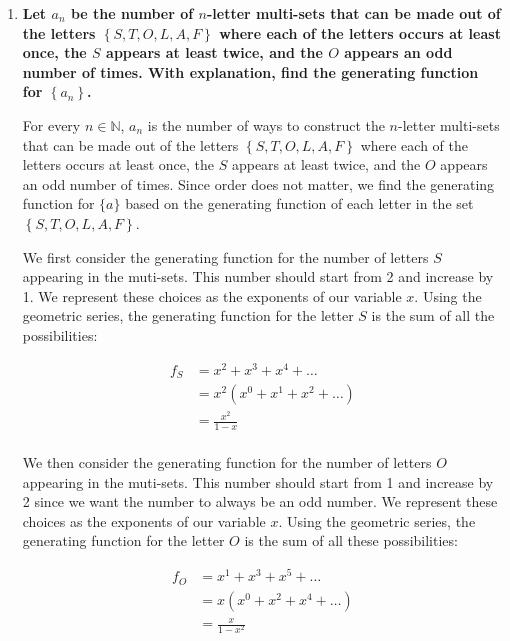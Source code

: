 \documentclass[10pt]{article}
\begin{document}
\begin{enumerate}
\begin{enumerate}
Using the formula $2^n = \sum\limits_{i=0}^n\binom{n}{i}$, we have:

\begin{align*}
\sum\limits_{k=1}^{2012}\binom{2011}{2012-k} &= \binom{2011}{2011} + \binom{2011}{2010} + \binom{2011}{2009} + \ldots + \binom{2011}{1} + \binom{2011}{0} \\
&= 2^{2011}
\end{align*}
\end{enumerate}
\vskip 1cm

\item  
\textbf{Let $a_n$ be the number of $n$-letter multi-sets that can be made out of the letters $\left\{  S,T,O,L,A,F \right\}$ where each of the letters occurs at least once, the $S$ appears at least twice, and the $O$ appears an odd number of times.  With explanation, find the generating function for $\left\{a_n\right\}$.}

For every $n \in \mathbb{N}$, $a_n$ is the number of ways to construct the $n$-letter multi-sets that can be made out of the letters $\left\{  S,T,O,L,A,F \right\}$ where each of the letters occurs at least once, the $S$ appears at least twice, and the $O$ appears an odd number of times. Since order does not matter, we find the generating function for $\{a\}$ based on the generating function of each letter in the set $\left\{  S,T,O,L,A,F \right\}$.

We first consider the generating function for the number of letters $S$ appearing in the muti-sets. This number should start from 2 and increase by 1. We represent these choices as the exponents of our variable $x$. Using the geometric series, the generating function for the letter $S$ is the sum of all the possibilities:

\begin{align*}
f_{S} &= x^2 + x^3 + x^4 + \ldots  \\
    &= x^2(x^0 + x^1 + x^2 + \ldots ) \\
    &= \frac{x^2}{1-x} \\
\end{align*}

We then consider the generating function for the number of letters $O$ appearing in the muti-sets.
This number should start from 1 and increase by 2 since we want the number to always be an odd number. We represent these choices as the exponents of our variable $x$. Using the geometric series, the generating function for the letter $O$ is the sum of all these possibilities:

\begin{align*}
f_O &= x^1 + x^3 + x^5 + \ldots  \\
    &= x(x^0 + x^2 + x^4 + \ldots ) \\
    &= \frac{x}{1-x^2} \\
\end{align*}


\end{enumerate}
\end{document}
